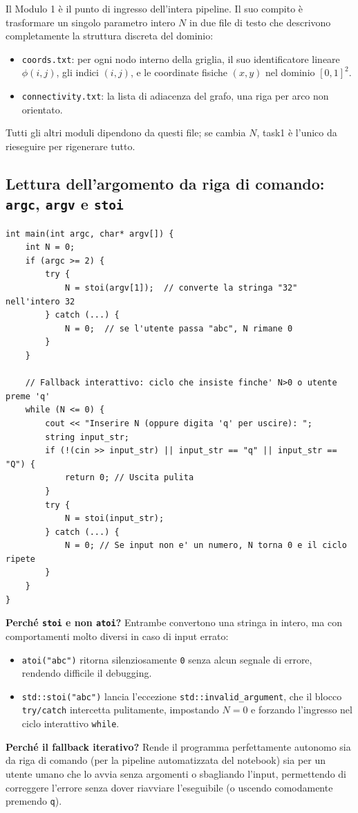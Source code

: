\documentclass[a4paper,11pt]{article}
\theoremstyle{definition}
\begin{document}
Il Modulo 1 è il punto di ingresso dell'intera pipeline. Il suo compito è trasformare un singolo parametro intero $N$ in due file di testo che descrivono completamente la struttura discreta del dominio:
\begin{itemize}
  \item \texttt{coords.txt}: per ogni nodo interno della griglia, il suo identificatore lineare $\phi(i,j)$, gli indici $(i,j)$, e le coordinate fisiche $(x,y)$ nel dominio $[0,1]^2$.
  \item \texttt{connectivity.txt}: la lista di adiacenza del grafo, una riga per arco non orientato.
\end{itemize}
Tutti gli altri moduli dipendono da questi file; se cambia $N$, task1 è l'unico da rieseguire per rigenerare tutto.

\subsection{Lettura dell'argomento da riga di comando: \texttt{argc}, \texttt{argv} e \texttt{stoi}}

\begin{lstlisting}[style=cpp, caption={Parsing robusto dell'argomento N}]
int main(int argc, char* argv[]) {
    int N = 0;
    if (argc >= 2) {
        try {
            N = stoi(argv[1]);  // converte la stringa "32" nell'intero 32
        } catch (...) {
            N = 0;  // se l'utente passa "abc", N rimane 0
        }
    }
    
    // Fallback interattivo: ciclo che insiste finche' N>0 o utente preme 'q'
    while (N <= 0) {
        cout << "Inserire N (oppure digita 'q' per uscire): ";
        string input_str;
        if (!(cin >> input_str) || input_str == "q" || input_str == "Q") {
            return 0; // Uscita pulita
        }
        try {
            N = stoi(input_str);
        } catch (...) {
            N = 0; // Se input non e' un numero, N torna 0 e il ciclo ripete
        }
    }
}
\end{lstlisting}

\textbf{Perché \texttt{stoi} e non \texttt{atoi}?} Entrambe convertono una stringa in intero, ma con comportamenti molto diversi in caso di input errato:
\begin{itemize}
  \item \texttt{atoi("abc")} ritorna silenziosamente \texttt{0} senza alcun segnale di errore, rendendo difficile il debugging.
  \item \texttt{std::stoi("abc")} lancia l'eccezione \texttt{std::invalid\_argument}, che il blocco \texttt{try/catch} intercetta pulitamente, impostando $N = 0$ e forzando l'ingresso nel ciclo interattivo \texttt{while}.
\end{itemize}
\textbf{Perché il fallback iterativo?} Rende il programma perfettamente autonomo sia da riga di comando (per la pipeline automatizzata del notebook) sia per un utente umano che lo avvia senza argomenti o sbagliando l'input, permettendo di correggere l'errore senza dover riavviare l'eseguibile (o uscendo comodamente premendo \texttt{q}).
\end{document}
